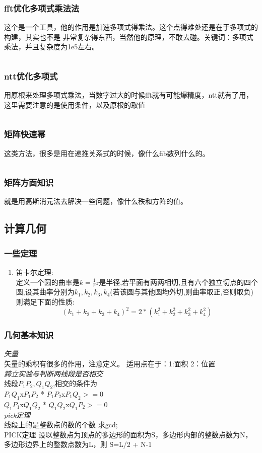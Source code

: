 \documentclass[a4paper,13.6pt]{article}
\begin{document}
\begin{CJK}{UTF8}{gbsn}
\subsubsection{fft优化多项式乘法法}
这个是一个工具，他的作用是加速多项式得乘法。这个点得难处还是在于多项式的构建，其实也不是
非常复杂得东西，当然他的原理，不敢去碰。关键词：多项式乘法，并且复杂度为1e5左右。
\inputminted{c++}{../scoure/math/fft.cpp}
\subsubsection{ntt优化多项式}
用原根来处理多项式乘法，当数字过大的时候fft就有可能爆精度，ntt就有了用，这里需要注意的是使用条件，以及原根的取值
\inputminted{c++}{../scoure/math/ntt.cpp}
\subsubsection{矩阵快速幂}
这类方法，很多是用在递推关系式的时候，像什么fib数列什么的。
\inputminted{c++}{../scoure/math/ju_quick.cpp}
\subsubsection{矩阵方面知识}
就是用高斯消元法去解决一些问题，像什么秩和方阵的值。
\subsection{计算几何}
\subsubsection{一些定理}
\begin{enumerate} %
    \item 笛卡尔定理: \\
    定义一个圆的曲率是$k = \frac{1}{r}$r是半径,若平面有两两相切,且有六个独立切点的四个圆,设其曲率分别为$k_1,k_2,k_3,k_4$(若该圆与其他圆均外切,则曲率取正,否则取负)则满足下面的性质:
    $$(k_1+k_2+k_3+k_4)^2 = 2*(k_1^2+k_2^2+k_3^2+k_4^2)$$
\end{enumerate}
\subsubsection{几何基本知识}
\emph{矢量}\\
矢量的乘积有很多的作用，注意定义。
适用点在于：1:面积 2：位置\\
\emph{跨立实验与判断两线段是否相交}\\
线段$P_1P_2,Q_1Q_2$,相交的条件为\\
$P_1Q_1$x$P_1P_2$  *  $P_1P_2$x$P_1Q_2>=0$\\
$Q_1P_1$x$Q_1Q_2$  *  $Q_1Q_2$x$Q_1P_2>=0$\\
\emph{pick定理}\\
线段上的是整数点的数的个数 求gcd;\\
PICK定理 设以整数点为顶点的多边形的面积为S，多边形内部的整数点数为N，多边形边界上的整数点数为L，则 S=L/2 + N-1


\end{CJK}
\end{document}
